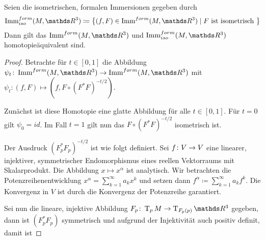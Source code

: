\begin{Satz}\label{satz:immerformiso}
  Seien die isometrischen, formalen Immersionen gegeben durch
  \begin{gather*}
    \Immfi{M}{\R^3} \coloneqq \set{(f,F) \in \Immf{M}{\R^3}}{F \text{
        ist isometrisch }}
  \end{gather*}
  Dann gilt das $\Immf{M}{\R^3}$ und $\Immfi{M}{\R^3}$
  homotopieäquivalent sind.
	\begin{proof}
          Betrachte für $t \in [0,1]$ die Abbildung
          $\abb{\psi_t}{\Immf{M}{\R^3}}{\Immf{M}{\R^3}}$ mit
          $\psi_t : (f,F) \mapsto (f,F \circ
          (F^{\ast}F)^{-t/2})$.
		
          Zunächst ist diese Homotopie eine glatte Abbildung für alle
          $ t \in [0,1] $. Für $ t=0 $ gilt $ \psi_0 = id $. Im Fall
          $ t=1 $ gilt nun das $ F \circ (F^{\ast}F)^{-t/2} $
          isometrisch ist.
		
          Der Ausdruck $ (F_p^\ast F_p)^{-t/2} $ ist wie folgt
          definiert. Sei $ f \colon V \rightarrow V $ eine linearer, injektiver,
          symmetrischer Endomorphismus eines reellen Vektorraums mit
          Skalarprodukt. Die Abbildung $ x\mapsto x^\alpha $ ist analytisch.
          Wir betrachten die Potenzreihenentwicklung $ x^\alpha = \sum_{k=1}^{\infty} a_k x^k $ und setzen dann $ f^\alpha \coloneqq \sum_{k=1}^{\infty} a_k f^k $. Die Konvergenz in $ V $ ist durch
          die Konvergenz der Potenzreihe garantiert.
		
          Sei nun die lineare, injektive Abbildung
          $ \abb{F_p}{\tang{p}{M}}{\tang{F_p(p)}{\R^3}} $ gegeben,
          dann ist $ (F_p^\ast F_p) $ symmetrisch und aufgrund der
          Injektivität auch positiv definit, damit ist
		

\end{proof}
\end{Satz}
